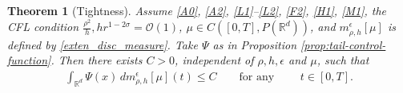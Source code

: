 \documentclass[a4paper,  twoside, 10pt, leqno]{amsart}
\newcommand{\R}{\mathbb{R}}
\newcommand{\rd}{\mathbb{R}^d}
\newtheorem{thm}{Theorem}[section]
\theoremstyle{remark}
\theoremstyle{definition}
\begin{document}

\begin{thm}[Tightness]\label{thm:thightness_m}
    Assume \ref{A0}, \ref{A2}, \ref{L1}--\ref{L2}, \ref{F2}, \ref{H1}, \ref{M1},  the CFL condition $\frac{\rho^2} h,hr^{1-2\sigma}=\mathcal{O}(1)$,  $\mu \in  C ( [0,T], P ( \rd ))$, and $m^{\epsilon}_{\rho,h}[\mu]$ is defined by \eqref{exten_disc_measure}. Take $\Psi$ as in Proposition \ref{prop:tail-control-function}. Then there exists $C>0$, independent  of $\rho, h, \epsilon$  and $\mu$, such that
\begin{align*}
\int_{\R^d} \Psi(x) \, dm^{\epsilon}_{\rho,h}[\mu](t) \leq C \qquad \mbox{for any } \qquad t\in[0,T].
\end{align*}
\end{thm}
\end{document}
